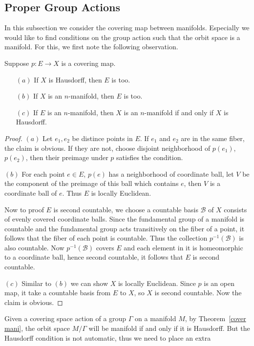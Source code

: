 \subsection{Proper Group Actions}
In this subsection we consider the covering map between manifolds. Especially we would like to find conditions on the group action such that the orbit space is a manifold. For this, we first note the following observation.
\begin{theorem}\label{cover mani}
Suppose $p:E\to X$ is a covering map.
\begin{itemize}
\item[$(a)$]If $X$ is Hausdorff, then $E$ is too.
\item[$(b)$]If $X$ is an $n$-manifold, then $E$ is too.
\item[$(c)$]If $E$ is an $n$-manifold, then $X$ is an $n$-manifold if and only if $X$ is Hausdorff.
\end{itemize}
\end{theorem}
\begin{proof}
$(a)$ Let $e_1,e_2$ be distince points in $E$. If $e_1$ and $e_2$ are in the same fiber, the claim is obvious. If they are not, choose disjoint neighborhood of $p(e_1)$, $p(e_2)$, then their preimage under $p$ satisfies the condition.\par
$(b)$ For each point $e\in E$, $p(e)$ has a neighborhood of coordinate ball, let $V$ be the component of the preimage of this ball which contains $e$, then $V$ is a coordinate ball of $e$. Thus $E$ is locally Euclidean.\par 
Now to proof $E$ is second countable, we choose a countable basis $\mathcal{B}$ of $X$ consists of evenly covered coordinate balls. Since the fundamental group of a manifold is countable and the fundamental group acts transitively on the fiber of a point, it follows that the fiber of each point is countable. Thus the collection $p^{-1}(\mathcal{B})$ is also countable. Now $p^{-1}(\mathcal{B})$ covers $E$ and each element in it is homeomorphic to a coordinate ball, hence second countable, it follows that $E$ is second countable.\par
$(c)$ Similar to $(b)$ we can show $X$ is locally Euclidean. Since $p$ is an open map, it take a countable basis from $E$ to $X$, so $X$ is second countable. Now the claim is obvious.
\end{proof}
Given a covering space action of a group $\Gamma$ on a manifold $M$, by 
Theorem~\ref{cover mani}, the orbit space $M/\Gamma$ will be manifold if and only if it is 
Hausdorff. But the Hausdorff condition is not automatic, thus we need to place an extra 
